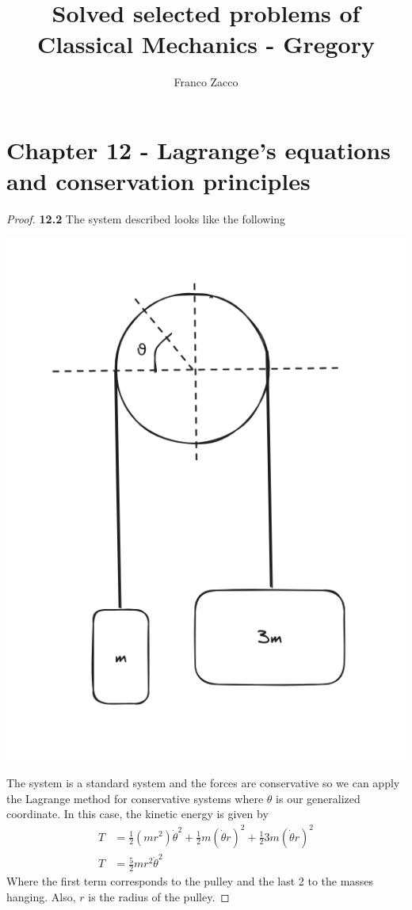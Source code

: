 \documentclass[11pt]{article}
\title{\textbf{Solved selected problems of Classical Mechanics - Gregory}}
\author{Franco Zacco}
\date{}
\theoremstyle{definition}
\begin{document}
\maketitle
\thispagestyle{empty}

\section*{Chapter 12 - Lagrange's equations and conservation principles}

\begin{proof}{\textbf{12.2}}
    The system described looks like the following
    \begin{center}
        \includegraphics[scale=0.4]{ch12-2.png}
    \end{center}
    The system is a standard system and the forces are conservative so we can
    apply the Lagrange method for conservative systems where $\theta$ is our
    generalized coordinate.
    In this case, the kinetic energy is given by
    \begin{align*}
        T &= \frac{1}{2}(mr^2)\dot{\theta}^2 + \frac{1}{2}m(\dot\theta r)^2
        + \frac{1}{2}3m(\dot\theta r)^2\\
        T &= \frac{5}{2}mr^2\dot{\theta}^2
    \end{align*}
    Where the first term corresponds to the pulley and the last 2 to the
    masses hanging. Also, $r$ is the radius of the pulley.
    

\end{proof}
\end{document}
